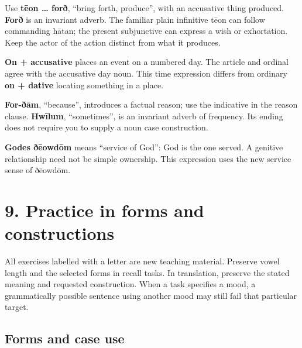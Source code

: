 Use \textbf{tēon … forð}, “bring forth, produce”, with an accusative thing produced. \textbf{Forð} is an invariant adverb. The familiar plain infinitive tēon can follow commanding hātan; the present subjunctive can express a wish or exhortation. Keep the actor of the action distinct from what it produces.

\textbf{On + accusative} places an event on a numbered day. The article and ordinal agree with the accusative day noun. This time expression differs from ordinary \textbf{on + dative} locating something in a place.

\textbf{For-ðām}, “because”, introduces a factual reason; use the indicative in the reason clause. \textbf{Hwīlum}, “sometimes”, is an invariant adverb of frequency. Its ending does not require you to supply a noun case construction.

\textbf{Godes ðēowdōm} means “service of God”: God is the one served. A genitive relationship need not be simple ownership. This expression uses the new service sense of ðēowdōm.

\section*{9. Practice in forms and constructions}

All exercises labelled with a letter are new teaching material. Preserve vowel length and the selected forms in recall tasks. In translation, preserve the stated meaning and requested construction. When a task specifies a mood, a grammatically possible sentence using another mood may still fail that particular target.

\subsection*{Forms and case use}

